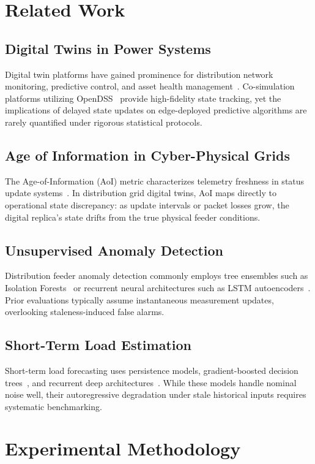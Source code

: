 \documentclass[journal]{IEEEtran}
\begin{document}
\section{Related Work}
\label{sec:related}

\subsection{Digital Twins in Power Systems}
Digital twin platforms have gained prominence for distribution network monitoring, predictive control, and asset health management~\cite{ref_dt_survey}. Co-simulation platforms utilizing OpenDSS~\cite{ref_opendss} provide high-fidelity state tracking, yet the implications of delayed state updates on edge-deployed predictive algorithms are rarely quantified under rigorous statistical protocols.

\subsection{Age of Information in Cyber-Physical Grids}
The Age-of-Information (AoI) metric characterizes telemetry freshness in status update systems~\cite{ref_aoi_theory}. In distribution grid digital twins, AoI maps directly to operational state discrepancy: as update intervals or packet losses grow, the digital replica's state drifts from the true physical feeder conditions.

\subsection{Unsupervised Anomaly Detection}
Distribution feeder anomaly detection commonly employs tree ensembles such as Isolation Forests~\cite{ref_isolation_forest} or recurrent neural architectures such as LSTM autoencoders~\cite{ref_lstm_ae}. Prior evaluations typically assume instantaneous measurement updates, overlooking staleness-induced false alarms.

\subsection{Short-Term Load Estimation}
Short-term load forecasting uses persistence models, gradient-boosted decision trees~\cite{ref_xgboost}, and recurrent deep architectures~\cite{ref_lstm_forecast}. While these models handle nominal noise well, their autoregressive degradation under stale historical inputs requires systematic benchmarking.


\section{Experimental Methodology}
\label{sec:methodology}
\end{document}
